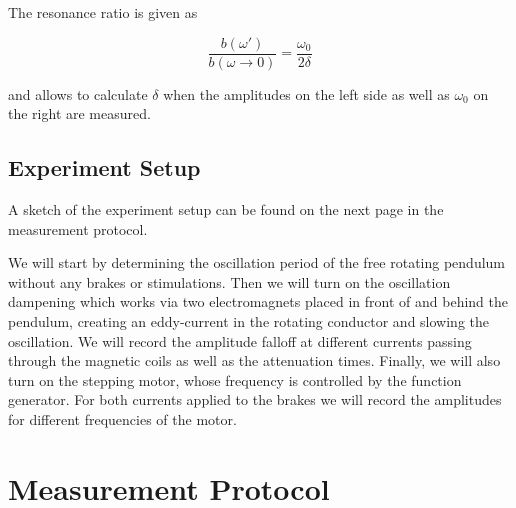 \documentclass{article}
\begin{document}
The resonance ratio is given as 

\begin{equation}
    \frac{b(\omega')}{b(\omega \rightarrow 0)} = \frac{\omega_0}{2\delta}
    \label{eq:9}
\end{equation}

and allows to calculate $\delta$ when the amplitudes on the left side as well as $\omega_0$ on the right are measured.

\subsection{Experiment Setup}

A sketch of the experiment setup can be found on the next page in the measurement protocol.

We will start by determining the oscillation period of the free rotating pendulum without any brakes or stimulations. Then we will turn on the oscillation dampening which works via two electromagnets placed in front of and behind the pendulum, creating an eddy-current in the rotating conductor and slowing the oscillation. We will record the amplitude falloff at different currents passing through the magnetic coils as well as the attenuation times. Finally, we will also turn on the stepping motor, whose frequency is controlled by the function generator. For both currents applied to the brakes we will record the amplitudes for different frequencies of the motor.

\newpage

\section{Measurement Protocol}
\end{document}
